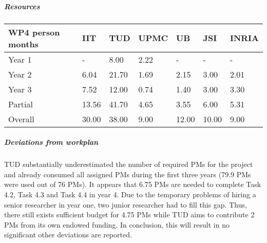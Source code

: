 
\subparagraph*{Resources}

\begin{center}
\begin{tabular}{|C{1.5cm}|C{1.5cm}|C{1.5cm}|C{2cm}|C{2cm}|C{2cm}|C{2cm}|}
\hline
\footnotesize \textbf{WP4 person months}& \footnotesize \textbf{IIT}&\footnotesize \textbf{TUD}&\footnotesize \textbf{UPMC}& \footnotesize \textbf{UB} &\footnotesize \textbf{JSI} &\footnotesize \textbf{INRIA}\\ \hline
\footnotesize Year 1  &  -  & 8.00 & 2.22 & - & - & -     \\  \hline
\footnotesize Year 2  &  6.04  & 21.70 & 1.69 & 2.15 & 3.00 & 2.01     \\  \hline
\footnotesize Year 3  &  7.52 & 12.00 & 0.74 & 1.40 & 3.00 & 3.30 \\  \hline
\footnotesize Partial &  13.56 & 41.70 & 4.65 & 3.55 & 6.00 & 5.31 \\ 
\hline \hline
\footnotesize Overall &  30.00 & 38.00 & 9.00 & 12.00 & 10.00 & 9.00 \\ \hline
\end{tabular}
\end{center}

\subparagraph*{Deviations from workplan} 
TUD substantially underestimated the number of required PMs for the project and already consumed all assigned PMs during the first three years (79.9 PMs were used out of 76 PMs). It appears that 6.75 PMs are needed to complete Task 4.2, Task 4.3 and Task 4.4 in year 4. Due to the temporary problems of hiring a senior researcher in year one, two junior researcher had to fill this gap. Thus, there still exists sufficient budget for 4.75 PMs while TUD aims to contribute 2 PMs from its own endowed funding. In conclusion, this will result in no significant other deviations are reported.

